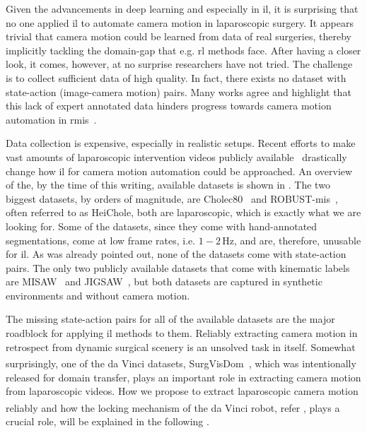Given the advancements in deep learning and especially in \gls{il}, it is surprising that no one applied \gls{il} to automate camera motion in laparoscopic surgery. It appears trivial that camera motion could be learned from data of real surgeries, thereby implicitly tackling the domain-gap that e.g. \gls{rl} methods face. After having a closer look, it comes, however, at no surprise researchers have not tried. The challenge is to collect sufficient data of high quality. In fact, there exists no dataset with state-action (image-camera motion) pairs. Many works agree and highlight that this lack of expert annotated data hinders progress towards camera motion automation in \gls{rmis}~\cite{maier2022surgical,kassahun2016surgical,esteva2019guide}.

Data collection is expensive, especially in realistic setups. Recent efforts to make vast amounts of laparoscopic intervention videos publicly available~\cite{maier2022surgical} drastically change how \gls{il} for camera motion automation could be approached. An overview of the, by the time of this writing, available datasets is shown in . The two biggest datasets, by orders of magnitude, are Cholec80~\cite{twinanda2016endonet} and ROBUST-\gls{mis}~\cite{maier2020heidelberg}, often referred to as HeiChole, both are laparoscopic, which is exactly what we are looking for. Some of the datasets, since they come with hand-annotated segmentations, come at low frame rates, i.e. $1-2\,\text{Hz}$, and are, therefore, unusable for \gls{il}. As was already pointed out, none of the datasets come with state-action pairs. The only two publicly available datasets that come with kinematic labels are MISAW~\cite{mitsuishi2013master} and JIGSAW~\cite{ahmidi2017dataset}, but both datasets are captured in synthetic environments and without camera motion.

The missing state-action pairs for all of the available datasets are the major roadblock for applying \gls{il} methods to them. Reliably extracting camera motion in retrospect from dynamic surgical scenery is an unsolved task in itself. Somewhat surprisingly, one of the da Vinci\textsuperscript{\textregistered} datasets, SurgVisDom~\cite{zia2021surgical}, which was intentionally released for domain transfer, plays an important role in extracting camera motion from laparoscopic videos. How we propose to extract laparoscopic camera motion reliably and how the locking mechanism of the da Vinci\textsuperscript{\textregistered} robot, refer , plays a crucial role, will be explained in the following .


